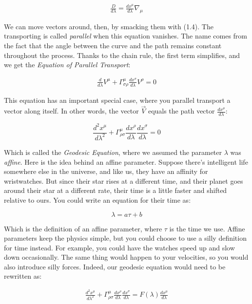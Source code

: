 \documentclass[10pt]{article}
\begin{document}
\begin{align}\label{eq:EFE}
\frac{D}{d\lambda} = \frac{dx^\mu}{d\lambda} \nabla_\mu
\end{align}

We can move vectors around, then, by smacking them with (1.4). The transporting is called \textit{parallel} when this equation vanishes. The name comes from the fact that the angle between the curve and the path remains constant throughout the process. Thanks to the chain rule, the first term simplifies, and we get the \textit{Equation of Parallel Transport}:

\begin{align}\label{eq:EFE}
\frac{d}{d\lambda}V^\mu + \Gamma^\mu_{\sigma \rho} \frac{dx^\sigma}{d\lambda} V^\rho = 0
\end{align}

This equation has an important special case, where you parallel transport a vector along itself. In other words, the vector $\vec{V}$ equals the path vector
$\frac{dx^\mu}{d\lambda}$:

\begin{equation}
    \boxed{\frac{d^2 x^\mu}{d\lambda^2} + \Gamma^{\mu}_{\rho \sigma} \frac{dx^\rho}{d\lambda} \frac{dx^\sigma}{d\lambda} = 0}
\end{equation}

Which is called the \textit{Geodesic Equation}, where we assumed the parameter $\lambda$ was \textit{affine}. Here is the idea behind an affine parameter. Suppose there's intelligent life somewhere else in the universe, and like us, they have an affinity for wristwatches. But since their star rises at a different time, and their planet goes around their star at a different rate, their time is a little faster and shifted relative to ours. You could write an equation for their time as:

\begin{equation}
    \lambda = a \tau + b
\end{equation}

Which is the definition of an affine parameter, where $\tau$ is the time we use. Affine parameters keep the physics simple, but you could choose to use a silly definition for time instead. For example, you could have the watches speed up and slow down occasionally. The same thing would happen to your velocities, so you would also introduce silly forces. Indeed, our geodesic equation would need to be rewritten as:

\begin{align}
    \frac{d^2 x^\mu}{d\lambda^2} + \Gamma^{\mu}_{\rho \sigma} \frac{dx^\rho}{d\lambda} \frac{dx^\sigma}{d\lambda} = F(\lambda) \frac{dx^\mu}{d\lambda}
\end{align}
\end{document}
